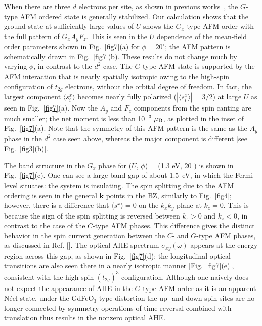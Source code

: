 \documentclass[aps,twocolumn,prb,preprintnumbers,amsmath,amssymb]{revtex4-2}
\begin{document}
When there are three $d$ electrons per site, 
 as shown in previous works~\cite{solovyev, mizokawa, zhang}, 
 the $G$-type AFM ordered state is generally stabilized. 
Our calculation shows that the ground state at sufficiently large values of $U$ shows the $G_x$-type AFM order  
 with the full pattern of $G_x A_y F_z$. 
This is seen in the $U$ dependence of the mean-field order parameters shown in Fig.~\ref{fig7}(a) for $\phi=20^\circ$; 
 the AFM pattern is schematically drawn in Fig.~\ref{fig7}(b). 
These results do not change much by varying $\phi$, in contrast to the $d^2$ case. 
The $G$-type AFM state is supported by the AFM interaction that is nearly spatially isotropic 
 owing to the high-spin configuration of $t_{2g}$ electrons, without the orbital degree of freedom.  
In fact, the largest component $\langle s_i^x \rangle$ becomes nearly fully polarized  ($|\langle s_i^x \rangle|=3/2$) at large $U$ as seen in Fig.~\ref{fig7}(a). 
Now the $A_y$ and $F_z$ components from the spin canting are much smaller; the net moment is less than 10$^{-3}$ $\mu_{\rm B}$, as plotted in the inset of Fig.~\ref{fig7}(a).  
Note that the symmetry of this AFM pattern is the same as the $A_y$ phase in the $d^2$ case seen above, 
 whereas the major component is different [see Fig.~\ref{fig3}(b)]. 

The band structure in the $G_x$ phase for ($U$, $\phi$) = (1.3 eV, 20$^\circ$) is shown in Fig.~\ref{fig7}(c). 
One can see a large band gap of about 1.5~eV, in which the Fermi level situates: the system is insulating. 
The spin splitting due to the AFM ordering is seen in the general $\bm k$ points in the BZ, similarly to Fig.~\ref{fig4}; 
however, there is a difference that $\langle s^x \rangle=0$ on the $k_xk_y$ plane at $k_z = 0$.
This is because the sign of the spin splitting is reversed between $k_z > 0$ and $k_z < 0$, in contrast to the case of the $C$-type AFM phases. 
This difference gives the distinct behavior in the spin current generation between the $C$- and $G$-type AFM phases, as discussed in Ref. [].
The optical AHE spectrum $\sigma_{xy}(\omega)$ appears at the energy region across this gap, as shown in Fig.~\ref{fig7}(d); 
 the longitudinal optical transitions are also seen there in a nearly isotropic manner [Fig.~\ref{fig7}(e)], 
 consistent with the high-spin $(t_{2g})^3$ configuration. 
Although one naively does not expect the appearance of AHE in the $G$-type AFM order as it is an apparent N\'{e}el state, 
 under the GdFeO$_3$-type distortion 
 the up- and down-spin sites are no longer connected by symmetry operations of time-reversal combined with translation 
 thus results in the nonzero optical AHE. 
\end{document}
